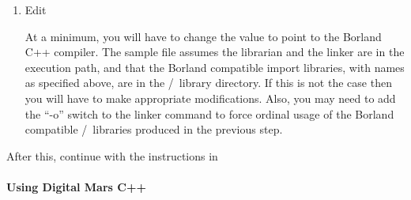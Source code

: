 \begin{enumerate}
If  doesn't work, you can try creating the necessary import
libraries directly from the \Tcl/\Tk\ DLL's.  From the \Tcl/\Tk\ library
directory issue the following commands:
\begin{quote}
\begin{verbatim}
impdef -a tcl84bc.def ..\bin\tcl84.dll
implib tcl84bc.lib tcl84bc.def
\end{verbatim}
\end{quote}
This creates the Borland compatible import library .
Repeat with ``tk'' in place of ``tcl'' to create .  The
``-a'' switch requests  to add a leading underscore to
function names.  This is sufficient for the DLL's shipped with \Tcl/\Tk\
8.4, but other releases may require additional tweaking.  The module
definition file output by \fn{impdef}, e.g., \fn{tcl84bc.def} above,
is a plain text file.  You may need to edit this file to add or modify
entries.


\item Edit 

At a minimum, you will have to change the 
value to point to the Borland C++ compiler.  The sample 
file assumes the librarian \fn{tlib} and the linker \fn{ilink32}
are in the execution path, and that the Borland compatible import
libraries, with names as specified above, are in the \Tcl/\Tk\ library
directory.  If this is not the case then you will have to make
appropriate modifications.  Also, you may need to add the ``-o'' switch
to the linker command to force ordinal usage of the Borland compatible
\Tcl/\Tk\ libraries produced in the previous step.

\end{enumerate}
After this, continue with the instructions in 
 

\paragraph{Using Digital Mars C++}

